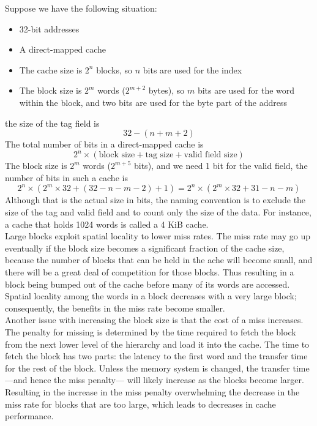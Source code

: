 \documentclass[12pt]{article}
\theoremstyle{definition}
\begin{document}
  Suppose we have the following situation:
  \begin{itemize}
    \item 32-bit addresses
    \item A direct-mapped cache
    \item The cache size is $2^{n}$ blocks, so $n$ bits are used for the index
    \item The block size is $2^{m}$ words ($2^{m+2}$ bytes), so $m$ bits are used for the word within the block, and two bits are used for the byte part of the address
  \end{itemize}
  the size of the tag field is
  $$32 - (n + m + 2)$$
  The total number of bits in a direct-mapped cache is
  $$2^{n} \times (\text{block size} + \text{tag size} + \text{valid field size})$$
  The block size is $2^{m}$ words ($2^{m+5}$ bits), and we need 1 bit for the valid field, the number of bits in such a cache is
  $$2^{n} \times (2^{m} \times 32 + (32 - n - m - 2) + 1) = 2^{n} \times (2^{m} \times 32 + 31 - n -m)$$
  Although that is the actual size in bits, the naming convention is to exclude the size of the tag and valid field and to count only the size of the data.
  For instance, a cache that holds 1024 words is called a 4 KiB cache. \\

  Large blocks exploit spatial locality to lower miss rates.
  The miss rate may go up eventually if the block size becomes a significant fraction of the cache size, because the number of blocks that can be held in the ache will become small, and there will be a great deal of competition for those blocks.
  Thus resulting in a block being bumped out of the cache before many of its words are accessed.
  Spatial locality among the words in a block decreases with a very large block; consequently, the benefits in the miss rate become smaller. \\

  Another issue with increasing the block size is that the cost of a miss increases.
  The penalty for missing is determined by the time required to fetch the block from the next lower level of the hierarchy and load it into the cache.
  The time to fetch the block has two parts: the latency to the first word and the transfer time for the rest of the block.
  Unless the memory system is changed, the transfer time---and hence the miss penalty--- will likely increase as the blocks become larger.
  Resulting in the increase in the miss penalty overwhelming the decrease in the miss rate for blocks that are too large, which leads to decreases in cache performance.
\end{document}
